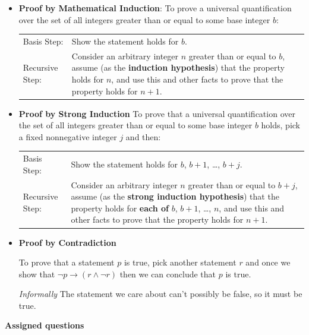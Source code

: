\begin{itemize}
    \item {\bf Proof by Mathematical Induction}: To prove a universal quantification over the set of  all integers greater than  or  equal to some base integer $b$:
    
    \begin{tabularx}{\textwidth}{l X}
        Basis Step: & Show the statement holds for $b$. \\
        Recursive Step: & Consider an arbitrary integer $n$ greater than or  equal to  $b$, assume
        (as the {\bf induction hypothesis})  that the property holds  for $n$, and use  this and
        other facts to  prove that  the property holds for $n+1$.
    \end{tabularx}
    
    \item {\bf Proof by Strong Induction} To prove that a universal quantification over the set of all integers greater than or equal to some  base integer $b$ holds,  pick a  fixed nonnegative integer  $j$ and then: \hfill 
    
    \begin{tabularx}{\textwidth}{l X}
        Basis Step: & Show the statement holds for $b$, $b+1$, \ldots, $b+j$. \\
        Recursive Step: & Consider an arbitrary integer $n$ greater than or  equal to  $b+j$, assume
        (as the {\bf strong  induction hypothesis})  that the property holds  for {\bf each of} $b$, $b+1$, \ldots, $n$, 	
        and use  this and
        other facts to  prove that  the property holds for $n+1$.
    \end{tabularx}

    \item {\bf Proof by Contradiction} 

    To prove that a statement $p$ is true, pick another statement $r$ and once we show
    that $\neg p  \to (r \wedge  \neg r)$ then  we can conclude that  $p$ is  true.
    
    {\it Informally} The statement we care about can't possibly be false, so it must be true.
\end{itemize}


{\bf Assigned questions}

